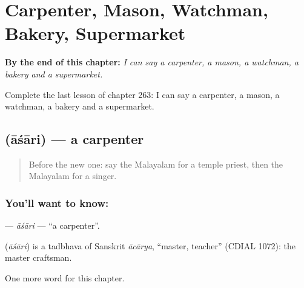 
\chapter{Carpenter, Mason, Watchman, Bakery, Supermarket}
\label{ch:ml-carpenter-mason-watchman-bakery-supermarket}

\begin{chapteropening}
\textbf{By the end of this chapter:} \emph{I can say a carpenter, a mason, a watchman, a bakery and a supermarket.}

Complete the last lesson of chapter 263: I can say a carpenter, a mason, a watchman, a bakery and a supermarket.
\end{chapteropening}

\section[\texorpdfstring{\ml{ആശാരി} (āśāri)}{ആശാരി (āśāri)}]{ (āśāri) — a carpenter}

\label{lesson:ML-C263-asari}



\begin{quote}
Before the new one: say the Malayalam for a temple priest, then the Malayalam for a singer.
\end{quote}

\subsection*{You'll want to know: }
\textbf{} — \emph{āśāri} — \textquotedblleft{}a carpenter\textquotedblright{}.

\begin{cousinweb}
\textbf{} (\emph{āśāri}) is a tadbhava of Sanskrit \emph{ācārya}, \textquotedblleft{}master, teacher\textquotedblright{} (CDIAL 1072): the master craftsman.
\end{cousinweb}

\begin{grammarlens}[title={What you've built}]
One more word for this chapter.
\end{grammarlens}


